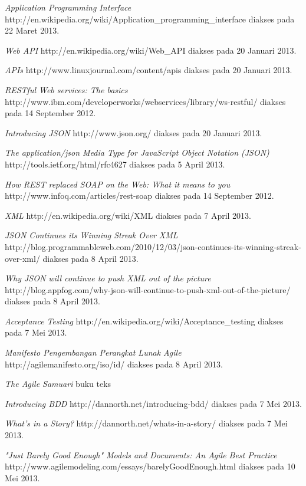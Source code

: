 \documentclass[a4paper, 12pt, oneside]{report}
\begin{document}
\begin{thebibliography}{99}
  \emph{Application Programming Interface}
  http://en.wikipedia.org/wiki/Application\_programming\_interface
  diakses pada 22 Maret 2013.
  
  \emph{Web API}
  http://en.wikipedia.org/wiki/Web\_API
  diakses pada 20 Januari 2013.
  
  \emph{APIs}
  http://www.linuxjournal.com/content/apis
  diakses pada 20 Januari 2013.

  \emph{RESTful Web services: The basics}
  \\http://www.ibm.com/developerworks/webservices/library/ws-restful/
  diakses pada 14 September 2012.

  \emph{Introducing JSON} http://www.json.org/
  diakses pada 20 Januari 2013.
  
  \emph{The application/json Media Type for JavaScript Object Notation (JSON)} http://tools.ietf.org/html/rfc4627
  diakses pada 5 April 2013.
    
  \emph{How REST replaced SOAP on the Web: What it means to you}
  http://www.infoq.com/articles/rest-soap
  diakses pada 14 September 2012.
  
  \emph{XML}
  http://en.wikipedia.org/wiki/XML
  diakses pada 7 April 2013.
  
  \emph{JSON Continues its Winning Streak Over XML}
  http://blog.programmableweb.com/2010/12/03/json-continues-its-winning-streak-over-xml/
  diakses pada 8 April 2013.
  
  \emph{Why JSON will continue to push XML out of the picture}
  http://blog.appfog.com/why-json-will-continue-to-push-xml-out-of-the-picture/
  diakses pada 8 April 2013.
  
  \emph{Acceptance Testing}
  http://en.wikipedia.org/wiki/Acceptance\_testing
  diakses pada 7 Mei 2013.

  \emph{Manifesto Pengembangan Perangkat Lunak Agile}
  http://agilemanifesto.org/iso/id/
  diakses pada 8 April 2013.
  
  \emph{The Agile Samuari}
  buku teks
  
  \emph{Introducing BDD}
  http://dannorth.net/introducing-bdd/
  diakses pada 7 Mei 2013.
  
  \emph{What's in a Story?}
  http://dannorth.net/whats-in-a-story/
  diakses pada 7 Mei 2013.

  \emph{"Just Barely Good Enough" Models and Documents: An Agile Best Practice}
  http://www.agilemodeling.com/essays/barelyGoodEnough.html
  diakses pada 10 Mei 2013.
 
\end{thebibliography}
\end{document}
